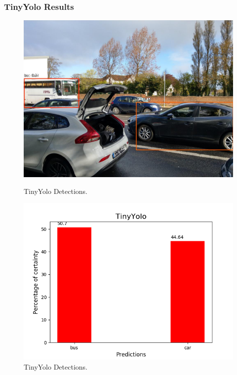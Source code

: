       \subsubsection{TinyYolo Results}

    \begin{figure}[htb]
        \centering
        \begin{minipage}[b]{0.44\textwidth}
          \includegraphics[width=\textwidth]{Sections/4InitialWork/4_images_obj_run1/yolo_tiny.jpg}
          \caption{TinyYolo Detections.}
        \end{minipage}
        \hfill
        \begin{minipage}[b]{0.50\textwidth}
          \includegraphics[width=\textwidth]{Sections/4InitialWork/4_images_obj_run1/yolo_tiny_graph.png}
          \caption{TinyYolo Detections.}
        \end{minipage}
      \end{figure}

